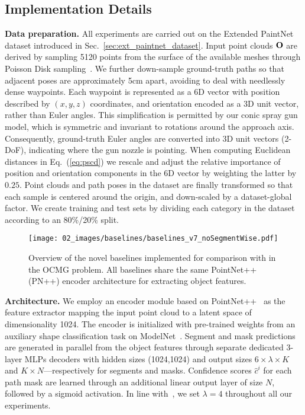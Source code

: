 \subsection{Implementation Details}
\label{sec:implementation_details}
\noindent \textbf{Data preparation.}
All experiments are carried out on the Extended PaintNet dataset introduced in Sec.~\ref{sec:ext_paintnet_dataset}.
%
Input point clouds $\mathbf{O}$ are derived by sampling 5120 points from the surface of the available meshes through Poisson Disk sampling~\cite{Cook_Stochastic_1986}.
%
We further down-sample ground-truth paths so that adjacent poses are approximately 5cm apart, avoiding to deal with needlessly dense waypoints.
Each waypoint is represented as a 6D vector with position described by $(x,y,z)$ coordinates, and orientation encoded as a 3D unit vector, rather than Euler angles. This simplification is permitted by our conic spray gun model, which is symmetric and invariant to rotations around the approach axis.
%
Consequently, ground-truth Euler angles are converted into 3D unit vectors (2-DoF), indicating where the gun nozzle is pointing.
%
When computing Euclidean distances in Eq.~(\ref{eq:pscd}) we rescale and adjust the relative importance of position and orientation components in the 6D vector by weighting the latter by $0.25$. 
%
Point clouds and path poses in the dataset are finally transformed so that each sample is centered around the origin, and down-scaled by a dataset-global factor.
%
We create training and test sets by dividing each category in the dataset according to an 80\%/20\% split. 

\begin{figure*}[!t]
    \centering
    \texttt{[image: 02\_images/baselines/baselines\_v7\_noSegmentWise.pdf]}
    \caption{Overview of the novel baselines implemented for comparison with \ours in the OCMG problem. All baselines share the same PointNet++ (PN++) encoder architecture for extracting object features.
    }
    \label{fig:baselines_overview}
    \vspace{-6pt}
\end{figure*}

\noindent \textbf{Architecture.} We employ an encoder module based on PointNet++~\cite{Qi_Pointnet++_2017} as the feature extractor mapping the input point cloud to a latent space of dimensionality 1024.
The encoder is initialized with pre-trained weights from an auxiliary shape classification task on ModelNet~\cite{wu_modelnet_2014}.
Segment and mask predictions are generated in parallel from the object features through separate dedicated 3-layer MLPs decoders with hidden sizes (1024,1024) and output sizes $6{\times}\lambda{\times} K$ and $K{\times} N$---respectively for segments and masks.
Confidence scores $\hat{c}^i$ for each path mask are learned through an additional linear output layer of size $N$, followed by a sigmoid activation.
In line with~\cite{tiboni2023paintnet}, we set $\lambda{=}4$ throughout all our experiments.

